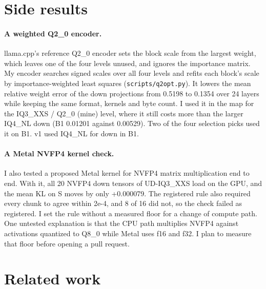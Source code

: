 \documentclass[11pt,a4paper]{article}
\newcommand{\code}[1]{\texttt{#1}}
\begin{document}
\section{Side results}
\label{sec:side}

\paragraph{A weighted Q2\_0 encoder.} llama.cpp's reference Q2\_0 encoder sets the block scale from the largest weight, which leaves one of the four levels unused, and ignores the importance matrix. My encoder searches signed scales over all four levels and refits each block's scale by importance-weighted least squares (\code{scripts/q2opt.py}). It lowers the mean relative weight error of the down projections from 0.5198 to 0.1354 over 24 layers while keeping the same format, kernels and byte count. I used it in the map for the IQ3\_XXS / Q2\_0 (mine) level, where it still costs more than the larger IQ4\_NL down (B1 0.01201 against 0.00529). Two of the four selection picks used it on B1. v1 used IQ4\_NL for down in B1.

\paragraph{A Metal NVFP4 kernel check.} I also tested a proposed Metal kernel for NVFP4 matrix multiplication end to end. With it, all 20 NVFP4 down tensors of UD-IQ3\_XXS load on the GPU, and the mean KL on S moves by only +0.000079. The registered rule also required every chunk to agree within 2e-4, and 8 of 16 did not, so the check failed as registered. I set the rule without a measured floor for a change of compute path. One untested explanation is that the CPU path multiplies NVFP4 against activations quantized to Q8\_0 while Metal uses f16 and f32. I plan to measure that floor before opening a pull request.

\section{Related work}
\end{document}
